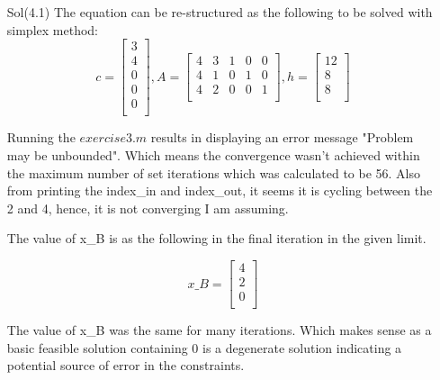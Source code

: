 \documentclass[unicode,11pt,a4paper,oneside,numbers=endperiod,openany]{scrartcl}
\begin{document}
\begin{enumerate}
 \item[Sol(4.1)] The equation can be re-structured as the following to be solved with simplex method:
 \begin{equation*}
  c=\begin{bmatrix}
     3 \\ 4 \\ 0 \\ 0 \\ 0\\
    \end{bmatrix},
    A=\begin{bmatrix}
       4 & 3 & 1 & 0 & 0 \\
       4 & 1 & 0 & 1 & 0 \\
       4 & 2 & 0 & 0 & 1 \\
      \end{bmatrix},
    h=\begin{bmatrix}
       12 \\ 8 \\ 8 \\
      \end{bmatrix}
 \end{equation*}

 Running the ${exercise3.m}$ results in displaying an error message "Problem may be unbounded". Which means the convergence wasn't achieved within the maximum number of set iterations which was calculated to be 56. Also from printing the index\_in and index\_out, it seems it is cycling between the 2 and 4, hence, it is not converging I am assuming.\\
 
 \newpage
 
 The value of x\_B is as the following in the final iteration in the given limit.
 
 \begin{center}
  \begin{equation*}
   x\_B=\begin{bmatrix}
         4 \\ 2 \\ 0 \\
        \end{bmatrix}
  \end{equation*}
 \end{center}
 
 The value of x\_B was the same for many iterations. Which makes sense as a basic feasible solution containing 0 is a degenerate solution indicating a potential source of error in the constraints.\\
 

\end{enumerate}
\end{document}
